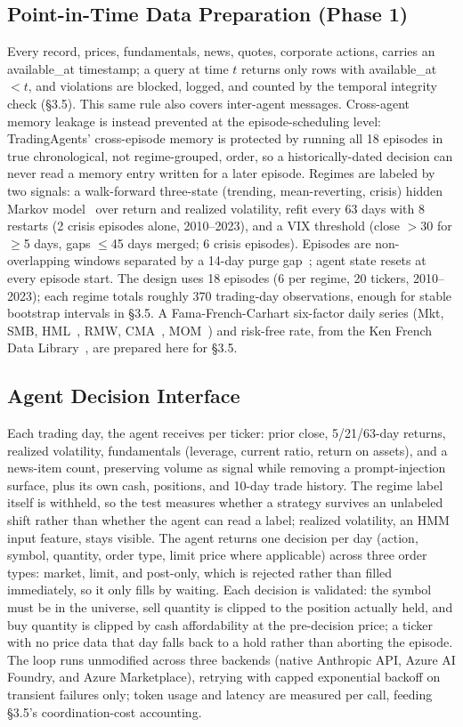 \documentclass{article}
\begin{document}
\subsection{Point-in-Time Data Preparation (Phase 1)}
Every record, prices, fundamentals, news, quotes, corporate actions, carries an available\_at timestamp; a query at time $t$ returns only rows with available\_at $<t$, and violations are blocked, logged, and counted by the temporal integrity check (\S3.5). This same rule also covers inter-agent messages. Cross-agent memory leakage is instead prevented at the episode-scheduling level: TradingAgents' cross-episode memory is protected by running all 18 episodes in true chronological, not regime-grouped, order, so a historically-dated decision can never read a memory entry written for a later episode.
Regimes are labeled by two signals: a walk-forward three-state (trending, mean-reverting, crisis) hidden Markov model~\cite{hamilton1989} over return and realized volatility, refit every 63 days with 8 restarts (2 crisis episodes alone, 2010--2023), and a VIX threshold (close $>$30 for $\geq$5 days, gaps $\leq$45 days merged; 6 crisis episodes). Episodes are non-overlapping windows separated by a 14-day purge gap~\cite{lopezdeprado2018}; agent state resets at every episode start.
The design uses 18 episodes (6 per regime, 20 tickers, 2010--2023); each regime totals roughly 370 trading-day observations, enough for stable bootstrap intervals in \S3.5. A Fama-French-Carhart six-factor daily series (Mkt, SMB, HML~\cite{fama1993}, RMW, CMA~\cite{fama2015}, MOM~\cite{carhart1997}) and risk-free rate, from the Ken French Data Library~\cite{frenchlib}, are prepared here for \S3.5.
\subsection{Agent Decision Interface}
Each trading day, the agent receives per ticker: prior close, 5/21/63-day returns, realized volatility, fundamentals (leverage, current ratio, return on assets), and a news-item count, preserving volume as signal while removing a prompt-injection surface, plus its own cash, positions, and 10-day trade history. The regime label itself is withheld, so the test measures whether a strategy survives an unlabeled shift rather than whether the agent can read a label; realized volatility, an HMM input feature, stays visible.
The agent returns one decision per day (action, symbol, quantity, order type, limit price where applicable) across three order types: market, limit, and post-only, which is rejected rather than filled immediately, so it only fills by waiting. Each decision is validated: the symbol must be in the universe, sell quantity is clipped to the position actually held, and buy quantity is clipped by cash affordability at the pre-decision price; a ticker with no price data that day falls back to a hold rather than aborting the episode.
The loop runs unmodified across three backends (native Anthropic API, Azure AI Foundry, and Azure Marketplace), retrying with capped exponential backoff on transient failures only; token usage and latency are measured per call, feeding \S3.5's coordination-cost accounting.
\end{document}
